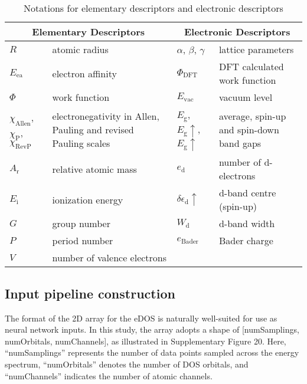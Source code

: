 \begin{table}[h]
  \centering
  \begin{tabular}{llll}
    \hline
    \multicolumn{2}{c}{Elementary Descriptors}       & \multicolumn{2}{c}{Electronic Descriptors}            \\
    \hline
    $R$            & atomic radius                   & $\alpha$, $\beta$, $\gamma$  & lattice parameters     \\
    $E_\text{ea}$  & electron affinity               & $\Phi_{\text{DFT}}$    & DFT calculated work function \\
    $\Phi$         & work function                   & $E_\text{vac}$         & vacuum level                 \\
    $\chi_\text{Allen}$, $\chi_\text{P}$, $\chi_\text{RevP}$
    & \parbox[t]{4cm}{electronegativity in Allen, Pauling and revised Pauling scales}
    & $E_\text{g}$, $E_\text{g}\uparrow$, $E_\text{g}\uparrow$
    & \parbox[t]{4cm}{average, spin-up and spin-down band gaps}                                              \\
    $A_\text{r}$   & relative atomic mass            & $e_\text{d}$           & number of d-electrons        \\
    $E_\text{i}$   & ionization energy & $\delta\epsilon_{\text{d}}\uparrow$  & d-band centre (spin-up)      \\
    $G$            & group number                    & $W_\text{d}$           & d-band width                 \\
    $P$            & period number                   & $e_{\text{Bader}}$     & Bader charge                 \\
    $V$            & number of valence electrons     &                        &                              \\
    \hline
  \end{tabular}
  \caption{Notations for elementary descriptors and electronic descriptors}
  \label{si_table15}
\end{table}


\subsection{Input pipeline construction}
The format of the 2D array for the eDOS is naturally well-suited for use as neural network inputs.
In this study, the array adopts a shape of [numSamplings, numOrbitals, numChannels], as illustrated in Supplementary Figure 20.
Here, “numSamplings” represents the number of data points sampled across the energy spectrum,
“numOrbitals” denotes the number of DOS orbitals,
and “numChannels” indicates the number of atomic channels.


